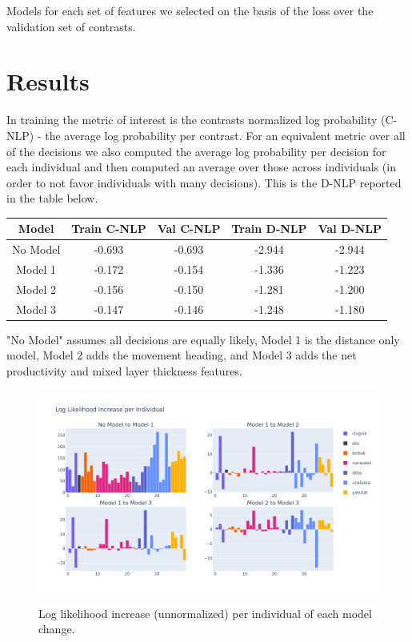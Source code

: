 \documentclass[11pt]{article}
\begin{document}
Models for each set of features we selected on the basis of the loss over the validation set of contrasts. 

\section*{Results}

In training the metric of interest is the contrasts normalized log probability (C-NLP) - the average log probability per contrast. For an equivalent metric over all of the decisions we also computed the average log probability per decision for each individual and then computed an average over those across individuals (in order to not favor individuals with many decisions). This is the D-NLP reported in the table below. 

\begin{center}
\begin{tabular}{| c | c | c | c | c |}
\hline 
Model & Train C-NLP & Val C-NLP & Train D-NLP & Val D-NLP \\
\hline
No Model & -0.693 & -0.693 & -2.944 & -2.944 \\
Model 1 & -0.172 & -0.154 & -1.336 & -1.223 \\
Model 2 & -0.156 & -0.150 & -1.281 & -1.200 \\
Model 3 & -0.147 & -0.146 & -1.248 & -1.180 \\
\hline
\end{tabular}
\end{center}

"No Model" assumes all decisions are equally likely, Model 1 is the distance only model, Model 2 adds the movement heading, and Model 3 adds the net productivity and mixed layer thickness features. \newline

\begin{figure}[h!] 
	\centering
  \includegraphics[height=70mm]{figures/ll_increase.png}
  \caption{Log likelihood increase (unnormalized) per individual of each model change.}
  \label{fig:ll_increase}
\end{figure}
\end{document}
